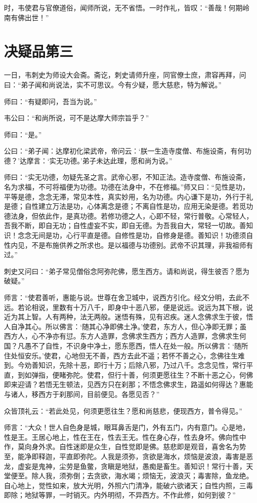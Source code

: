\documentclass[UTF8, 11pt, oneside]{ctexart}
\begin{document}
时，韦使君与官僚道俗，闻师所说，无不省悟。一时作礼，皆叹：“善哉！何期岭南有佛出世！”



\section*{决疑品第三}

一日，韦刺史为师设大会斋。斋讫，刺史请师升座，同官僚士庶，肃容再拜，问曰：“弟子闻和尚说法，实不可思议。今有少疑，愿大慈悲，特为解说。”

师曰：“有疑即问，吾当为说。”

韦公曰：“和尚所说，可不是达摩大师宗旨乎？”

师曰：“是。”

公曰：“弟子闻：达摩初化梁武帝，帝问云：‘朕一生造寺度僧、布施设斋，有何功德？’达摩言：‘实无功德。’弟子未达此理，愿和尚为说。”

师曰：“实无功德，勿疑先圣之言。武帝心邪，不知正法。造寺度僧、布施设斋，名为求福，不可将福便为功德。功德在法身中，不在修福。”师又曰：“见性是功，平等是德，念念无滞，常见本性，真实妙用，名为功德。内心谦下是功，外行于礼是德；自性建立万法是功，心体离念是德；不离自性是功，应用无染是德。若觅功德法身，但依此作，是真功德。若修功德之人，心即不轻，常行普敬。心常轻人，吾我不断，即自无功；自性虚妄不实，即自无德。为吾我自大，常轻一切故。善知识！念念无间是功，心行平直是德。自修性是功，自修身是德。善知识！功德须自性内见，不是布施供养之所求也。是以福德与功德别。武帝不识其理，非我祖师有过。”

刺史又问曰：“弟子常见僧俗念阿弥陀佛，愿生西方。请和尚说，得生彼否？愿为破疑。”

师言：“使君善听，惠能与说。世尊在舍卫城中，说西方引化。经文分明，去此不远。若论相说，里数有十万八千，即身中十恶八邪，便是说远。说远为其下根，说近为其上智。人有两种，法无两般。迷悟有殊，见有迟疾。迷人念佛求生于彼，悟人自净其心。所以佛言：‘随其心净即佛土净。’使君，东方人，但心净即无罪；虽西方人，心不净亦有愆。东方人造罪，念佛求生西方；西方人造罪，念佛求生何国？凡愚不了自性，不识身中净土，愿东愿西，悟人在处一般。所以佛言：‘随所住处恒安乐。’使君，心地但无不善，西方去此不遥；若怀不善之心，念佛往生难到。今劝善知识，先除十恶，即行十万；后除八邪，乃过八千。念念见性，常行平直，到如弹指，便睹弥陀。使君，但行十善，何须更愿往生？不断十恶之心，何佛即来迎请？若悟无生顿法，见西方只在刹那；不悟念佛求生，路遥如何得达？惠能与诸人，移西方于刹那间，目前便见。各愿见否？”

众皆顶礼云：“若此处见，何须更愿往生？愿和尚慈悲，便现西方，普令得见。”

师言：“大众！世人自色身是城，眼耳鼻舌是门，外有五门，内有意门。心是地，性是王。王居心地上，性在王在，性去王无。性在身心存，性去身坏。佛向性中作，莫向身外求。自性迷即是众生，自性觉即是佛。慈悲即是观音，喜舍名为势至，能净即释迦，平直即弥陀。人我是须弥，贪欲是海水，烦恼是波浪，毒害是恶龙，虚妄是鬼神，尘劳是鱼鳖，贪瞋是地狱，愚痴是畜生。善知识！常行十善，天堂便至。除人我，须弥倒；去贪欲，海水竭；烦恼无，波浪灭；毒害除，鱼龙绝。自心地上，觉性如来，放大光明，外照六门清净，能破六欲诸天；自性内照，三毒即除；地狱等罪，一时销灭。内外明彻，不异西方。不作此修，如何到彼？”
\end{document}

